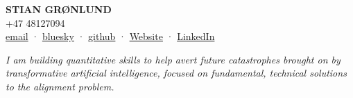 \documentclass[11pt,a4paper]{article}
\begin{document}
\begin{center}
    \huge\textbf{STIAN GRØNLUND}\\[0.3em]
    \normalsize
    +47 48127094\\
    \href{mailto:stian.sgronlund@outlook.com}{email} · 
    \href{https://bsky.app/profile/meraxion.bsky.social}{bluesky} · 
    \href{https://github.com/meraxion/}{github} · 
    \href{https://noixarem.no}{Website} · 
    \href{https://linkedin.com/in/sgronlund}{LinkedIn}

\end{center}

\medskip
\par\textit{I am building quantitative skills to help avert future catastrophes brought on by transformative artificial intelligence, focused on fundamental, technical solutions to the alignment problem.}
\end{document}

